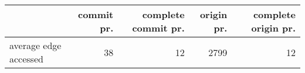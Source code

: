 \documentclass[11pt,a4paper]{article}
\begin{document}
\vspace{0.5cm}

\begin{center}
    \begin{tabular}{@{} l *4r @{}}
        \toprule
        \multicolumn{1}{c}{} &
            \textbf{commit pr.} &
            \textbf{complete commit pr.} &
            \textbf{origin pr.} &
            \textbf{complete origin pr.} \\
        \midrule
        average edge accessed & 38 & 12 & 2799 & 12 \\
        \bottomrule
    \end{tabular}
\end{center}
\end{document}
